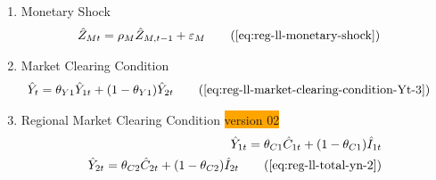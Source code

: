 \documentclass[../thesis.tex]{subfiles}
\begin{document}
{\begin{enumerate}
		\item Monetary Shock
		\begin{alignat}{2}
			\hat{Z}_{Mt} &= \rho_M \hat{Z}_{M,t-1} + \varepsilon_{M} \tag{\ref{eq:reg-ll-monetary-shock}}
		\end{alignat}
		
		\item Market Clearing Condition
		\begin{align}
			\hat{Y}_{t} &= \theta_{Y1} \hat{Y}_{1t} + (1-\theta_{Y1}) \hat{Y}_{2t} \tag{\ref{eq:reg-ll-market-clearing-condition-Yt-3}}
		\end{align}
		
		\item Regional Market Clearing Condition \colorbox{orange}{version 02}
		\begin{align}
			\hat{Y}_{1t} = \theta_{C1} \hat{C}_{1t} + (1 - \theta_{C1}) \hat{I}_{1t} \nonumber \\
			\hat{Y}_{2t} = \theta_{C2} \hat{C}_{2t} + (1 - \theta_{C2}) \hat{I}_{2t} \tag{\ref{eq:reg-ll-total-yn-2}}
		\end{align}
		
	\end{enumerate}
	
} %
\end{document}
